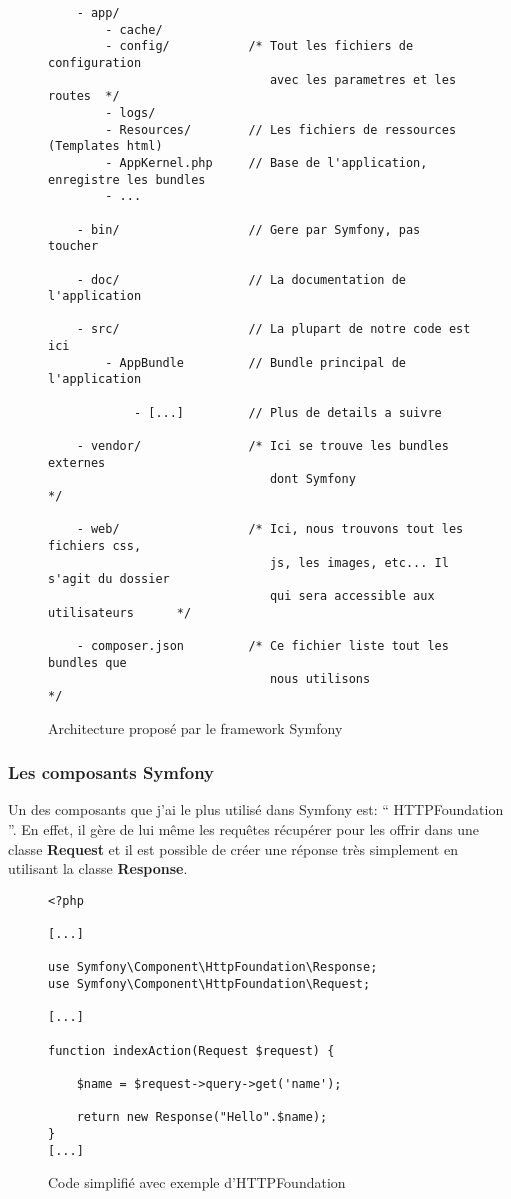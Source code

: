\begin{figure}[h]
\begin{lstlisting}
    - app/
        - cache/
        - config/           /* Tout les fichiers de configuration
                               avec les parametres et les routes  */
        - logs/
        - Resources/        // Les fichiers de ressources (Templates html)
        - AppKernel.php     // Base de l'application, enregistre les bundles
        - ...

    - bin/                  // Gere par Symfony, pas toucher

    - doc/                  // La documentation de l'application

    - src/                  // La plupart de notre code est ici
        - AppBundle         // Bundle principal de l'application

            - [...]         // Plus de details a suivre

    - vendor/               /* Ici se trouve les bundles externes
                               dont Symfony                       */

    - web/                  /* Ici, nous trouvons tout les fichiers css,
                               js, les images, etc... Il s'agit du dossier
                               qui sera accessible aux utilisateurs      */

    - composer.json         /* Ce fichier liste tout les bundles que 
                               nous utilisons                       */
\end{lstlisting}
\caption{Architecture proposé par le framework Symfony}
\end{figure}

\newpage

\subsubsection*{Les composants Symfony}

Un des composants que j'ai le plus utilisé dans Symfony est: `` HTTPFoundation ''. En effet, il gère de lui même les requêtes récupérer pour les offrir dans une classe \textbf{Request} et il est possible de créer une réponse très simplement en utilisant la classe \textbf{Response}.

\begin{figure}[h]
\begin{lstlisting}[frame=single]
<?php

[...]

use Symfony\Component\HttpFoundation\Response;
use Symfony\Component\HttpFoundation\Request;

[...]

function indexAction(Request $request) {

    $name = $request->query->get('name');

    return new Response("Hello".$name);
}
[...]

\end{lstlisting}
\caption{Code simplifié avec exemple d'HTTPFoundation}
\end{figure}

